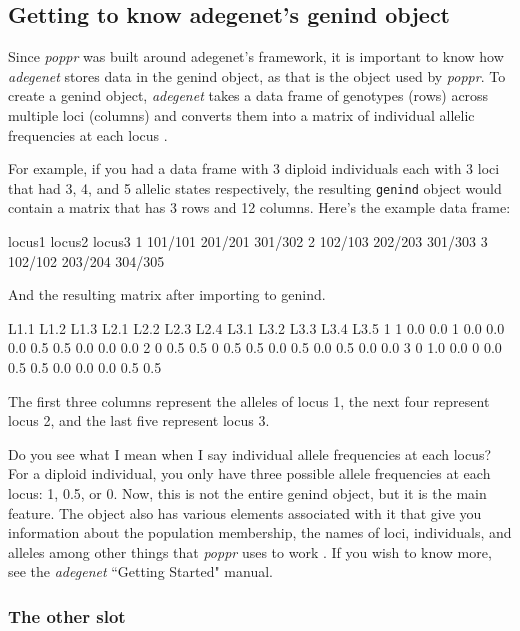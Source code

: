 \documentclass[letterpaper]{article}
\newcommand{\tab}{\hspace*{1em}}
\begin{document}
\subsection{Getting to know adegenet's genind object}\label{intro:genind}

\tab\tab Since \textit{poppr} was built around adegenet's framework, it is important to know how \textit{adegenet} stores data in the genind object, as that is the object used by \textit{poppr}. To create a genind object, \textit{adegenet} takes a data frame of genotypes (rows) across multiple loci (columns) and converts them into a matrix of individual allelic frequencies at each locus \cite{Jombart:2008}.

For example, if you had a data frame with 3 diploid individuals each with 3 loci that had 3, 4, and 5 allelic states respectively, the resulting \texttt{genind} object would contain a matrix that has 3 rows and 12 columns. 
\noindent Here's the example data frame:
\begin{Schunk}
\begin{Soutput}
   locus1  locus2  locus3
1 101/101 201/201 301/302
2 102/103 202/203 301/303
3 102/102 203/204 304/305
\end{Soutput}
\end{Schunk}
And the resulting matrix after importing to genind.
\begin{Schunk}
\begin{Soutput}
  L1.1 L1.2 L1.3 L2.1 L2.2 L2.3 L2.4 L3.1 L3.2 L3.3 L3.4 L3.5
1    1  0.0  0.0    1  0.0  0.0  0.0  0.5  0.5  0.0  0.0  0.0
2    0  0.5  0.5    0  0.5  0.5  0.0  0.5  0.0  0.5  0.0  0.0
3    0  1.0  0.0    0  0.0  0.5  0.5  0.0  0.0  0.0  0.5  0.5
\end{Soutput}
\end{Schunk}
The first three columns represent the alleles of locus 1, the next four represent locus 2, and the last five represent locus 3.

Do you see what I mean when I say individual allele frequencies at each locus? For a diploid individual, you only have three possible allele frequencies at each locus: 1, 0.5, or 0. Now, this is not the entire genind object, but it is the main feature. The object also has various elements associated with it that give you information about the population membership, the names of loci, individuals, and alleles among other things that \textit{poppr} uses to work \cite{Jombart:2008}. If you wish to know more, see the \textit{adegenet} ``Getting Started" manual. 
\subsubsection{The other slot}\label{intro:genind:other}
\end{document}
